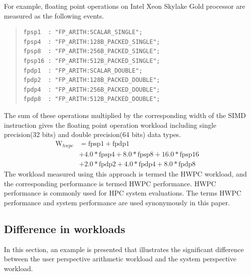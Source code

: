 \documentclass[conference]{IEEEtran}
\begin{document}
For example, floating point operations on
Intel Xeon Skylake Gold processor %
are measured as the following events.
\vspace{1mm}
\begin{quote}
\begin{small}
\begin{verbatim}
fpsp1  : "FP_ARITH:SCALAR_SINGLE";
fpsp4  : "FP_ARITH:128B_PACKED_SINGLE";
fpsp8  : "FP_ARITH:256B_PACKED_SINGLE";
fpsp16 : "FP_ARITH:512B_PACKED_SINGLE";
fpdp1  : "FP_ARITH:SCALAR_DOUBLE";
fpdp2  : "FP_ARITH:128B_PACKED_DOUBLE";
fpdp4  : "FP_ARITH:256B_PACKED_DOUBLE";
fpdp8  : "FP_ARITH:512B_PACKED_DOUBLE";
\end{verbatim}
\end{small}
\end{quote}
\vspace{1mm}
The sum of these operations multiplied by the corresponding width
of the SIMD instruction gives the floating point operation workload
including single precision(32 bits) and double precision(64 bits) data types.
\begin{align}
	\mathrm{W}_{hwpc} & = \mathrm{fpsp1} + \mathrm{fpdp1} \nonumber \\
			& + 4.0*\mathrm{fpsp4} + 8.0*\mathrm{fpsp8} + 16.0*\mathrm{fpsp16} \nonumber \\
			& + 2.0*\mathrm{fpdp2} + 4.0*\mathrm{fpdp4} + 8.0*\mathrm{fpdp8}
\end{align}
%
The workload measured using this approach is termed the HWPC workload,
and the corresponding performance is termed HWPC performance.
HWPC performance is commonly used for HPC system evaluations.
The terms HWPC performance and system performance are used synonymously
in this paper.

%
\subsection{Difference in workloads}
\label{subsection:difference-in-workloads}

In this section, an example is presented that illustrates the significant
difference between the user perspective arithmetic workload and
the system perspective workload.
\end{document}
